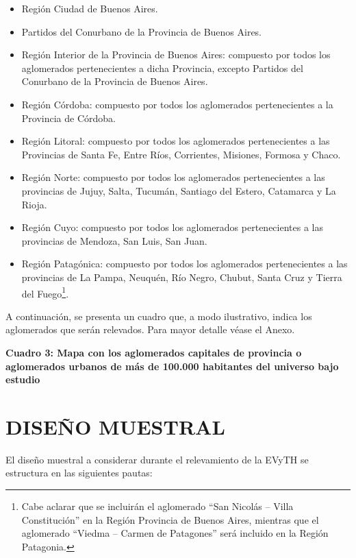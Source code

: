\documentclass[
  openany]{book}
\begin{document}
\begin{itemize}
\item
  Región Ciudad de Buenos Aires.
\item
  Partidos del Conurbano de la Provincia de Buenos Aires.
\item
  Región Interior de la Provincia de Buenos Aires: compuesto por todos los aglomerados pertenecientes a dicha Provincia, excepto Partidos del Conurbano de la Provincia de Buenos Aires.
\item
  Región Córdoba: compuesto por todos los aglomerados pertenecientes a la Provincia de Córdoba.
\item
  Región Litoral: compuesto por todos los aglomerados pertenecientes a las Provincias de Santa Fe, Entre Ríos, Corrientes, Misiones, Formosa y Chaco.
\item
  Región Norte: compuesto por todos los aglomerados pertenecientes a las provincias de Jujuy, Salta, Tucumán, Santiago del Estero, Catamarca y La Rioja.
\item
  Región Cuyo: compuesto por todos los aglomerados pertenecientes a las provincias de Mendoza, San Luis, San Juan.
\item
  Región Patagónica: compuesto por todos los aglomerados pertenecientes a las provincias de La Pampa, Neuquén, Río Negro, Chubut, Santa Cruz y Tierra del Fuego\footnote{Cabe aclarar que se incluirán el aglomerado ``San Nicolás -- Villa Constitución'' en la Región Provincia de Buenos Aires, mientras que el aglomerado ``Viedma -- Carmen de Patagones'' será incluido en la Región Patagonia.}.
\end{itemize}

A continuación, se presenta un cuadro que, a modo ilustrativo, indica los aglomerados que serán relevados.
Para mayor detalle véase el Anexo.

\textbf{Cuadro 3: Mapa con los aglomerados capitales de provincia o aglomerados urbanos de más de 100.000 habitantes del universo bajo estudio}

\hypertarget{diseuxf1o-muestral}{%
\section{\texorpdfstring{\textbf{DISEÑO MUESTRAL}}{DISEÑO MUESTRAL}}\label{diseuxf1o-muestral}}

El diseño muestral a considerar durante el relevamiento de la EVyTH se estructura en las siguientes pautas:
\end{document}
